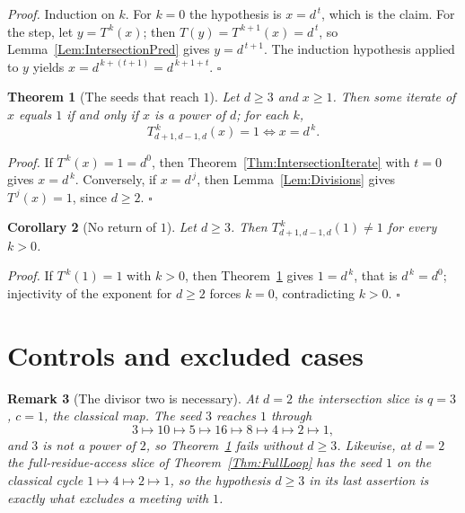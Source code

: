 \documentclass[11pt,letterpaper]{article}
\newtheorem{theorem}{Theorem}
\newtheorem{corollary}[theorem]{Corollary}
\newtheorem{remark}[theorem]{Remark}
\newenvironment{proof}{\noindent\textit{Proof.}}{\hfill\(\square\)}
\begin{document}
\begin{proof}
Induction on \(k\). For \(k=0\) the hypothesis is \(x=d^{\,t}\), which is the
claim. For the step, let \(y=T^{\,k}(x)\); then
\(T(y)=T^{\,k+1}(x)=d^{\,t}\), so Lemma~\ref{Lem:IntersectionPred} gives
\(y=d^{\,t+1}\). The induction hypothesis applied to \(y\) yields
\(x=d^{\,k+(t+1)}=d^{\,k+1+t}\).
\end{proof}

\begin{theorem}[The seeds that reach \(1\)]\label{Thm:IntersectionReach}
Let \(d\ge3\) and \(x\ge1\). Then some iterate of \(x\) equals \(1\) if and
only if \(x\) is a power of \(d\); for each \(k\),
\[
 T_{d+1,d-1,d}^{\,k}(x)=1 \iff x=d^{\,k} .
\]
\end{theorem}

\begin{proof}
If \(T^{\,k}(x)=1=d^{0}\), then Theorem~\ref{Thm:IntersectionIterate} with
\(t=0\) gives \(x=d^{\,k}\). Conversely, if \(x=d^{\,j}\), then
Lemma~\ref{Lem:Divisions} gives \(T^{\,j}(x)=1\), since \(d\ge2\).
\end{proof}

\begin{corollary}[No return of \(1\)]\label{Cor:NoReturn}
Let \(d\ge3\). Then \(T_{d+1,d-1,d}^{\,k}(1)\ne1\) for every \(k>0\).
\end{corollary}

\begin{proof}
If \(T^{\,k}(1)=1\) with \(k>0\), then
Theorem~\ref{Thm:IntersectionReach} gives \(1=d^{\,k}\), that is
\(d^{\,k}=d^{0}\); injectivity of the exponent for \(d\ge2\) forces \(k=0\),
contradicting \(k>0\).
\end{proof}

\section{Controls and excluded cases}

\begin{remark}[The divisor two is necessary]\label{Rem:TwoNecessary}
At \(d=2\) the intersection slice is \(q=3\), \(c=1\), the classical map. The
seed \(3\) reaches \(1\) through
\[
 3\mapsto10\mapsto5\mapsto16\mapsto8\mapsto4\mapsto2\mapsto1,
\]
and \(3\) is not a power of \(2\), so Theorem~\ref{Thm:IntersectionReach} fails
without \(d\ge3\). Likewise, at \(d=2\) the full-residue-access slice of
Theorem~\ref{Thm:FullLoop} has the seed \(1\) on the classical cycle
\(1\mapsto4\mapsto2\mapsto1\), so the hypothesis \(d\ge3\) in its last
assertion is exactly what excludes a meeting with \(1\).
\end{remark}
\end{document}
